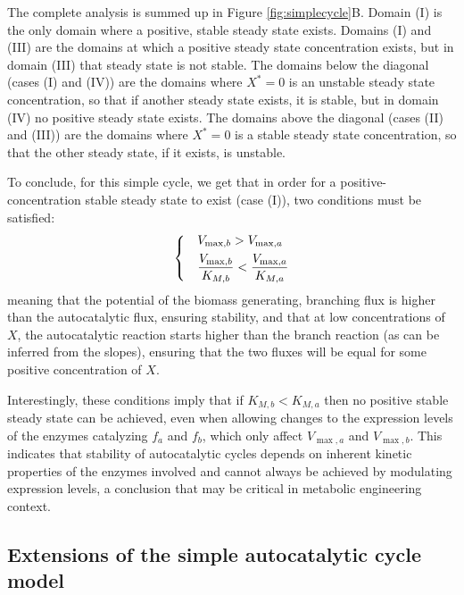     The complete analysis is summed up in Figure \ref{fig:simplecycle}B.
    Domain (I) is the only domain where a positive, stable steady state exists.
    Domains (I) and (III) are the domains at which a positive steady state concentration exists, but in domain (III) that steady state is not stable.
    The domains below the diagonal (cases (I) and (IV)) are the domains where $X^*=0$ is an unstable steady state concentration, so that if another steady state exists, it is stable, but in domain (IV) no positive steady state exists.
    The domains above the diagonal (cases (II) and (III)) are the domains where $X^*=0$ is a stable steady state concentration, so that the other steady state, if it exists, is unstable.

    To conclude, for this simple cycle, we get that in order for a positive-concentration stable steady state to exist (case (I)), two conditions must be satisfied:
    \begin{equation}
    \label{eq:stabconds}
    \begin{dcases}
      & V_{\max,b}>V_{\max,a} \\
      & \frac{V_{\max,b}}{K_{M,b}}<\frac{V_{\max,a}}{K_{M,a}}
    \end{dcases}
    \end{equation}
    meaning that the potential of the biomass generating, branching flux is higher than the autocatalytic flux, ensuring stability, and that at low concentrations of $X$, the autocatalytic reaction starts higher than the branch reaction (as can be inferred from the slopes), ensuring that the two fluxes will be equal for some positive concentration of $X$.

    Interestingly, these conditions imply that if $K_{M,b}<K_{M,a}$ then no positive stable steady state can be achieved, even when allowing changes to the expression levels of the enzymes catalyzing $f_a$ and $f_b$, which only affect $V_{\max,a}$ and $V_{\max,b}$.
    This indicates that stability of autocatalytic cycles depends on inherent kinetic properties of the enzymes involved and cannot always be achieved by modulating expression levels, a conclusion that may be critical in metabolic engineering context.
\subsection{Extensions of the simple autocatalytic cycle model}
